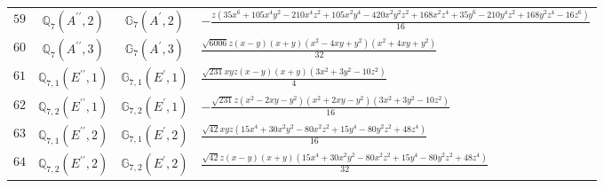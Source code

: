 \documentclass[fleqn,8pt,landscape]{jsarticle}
\begin{document}
\begin{table}[ht!]
\begin{center}
\begin{tabular}{cccl}
$ 59 $ & $ \mathbb{Q}_{7}(A^{\prime\prime},2) $ & $ \mathbb{G}_{7}(A^{\prime},2) $ & $ - \frac{z \left(35 x^{6} + 105 x^{4} y^{2} - 210 x^{4} z^{2} + 105 x^{2} y^{4} - 420 x^{2} y^{2} z^{2} + 168 x^{2} z^{4} + 35 y^{6} - 210 y^{4} z^{2} + 168 y^{2} z^{4} - 16 z^{6}\right)}{16} $ \\
$ 60 $ & $ \mathbb{Q}_{7}(A^{\prime\prime},3) $ & $ \mathbb{G}_{7}(A^{\prime},3) $ & $ \frac{\sqrt{6006} z \left(x - y\right) \left(x + y\right) \left(x^{2} - 4 x y + y^{2}\right) \left(x^{2} + 4 x y + y^{2}\right)}{32} $ \\
$ 61 $ & $ \mathbb{Q}_{7,1}(E^{\prime\prime},1) $ & $ \mathbb{G}_{7,1}(E^{\prime},1) $ & $ \frac{\sqrt{231} x y z \left(x - y\right) \left(x + y\right) \left(3 x^{2} + 3 y^{2} - 10 z^{2}\right)}{4} $ \\
$ 62 $ & $ \mathbb{Q}_{7,2}(E^{\prime\prime},1) $ & $ \mathbb{G}_{7,2}(E^{\prime},1) $ & $ - \frac{\sqrt{231} z \left(x^{2} - 2 x y - y^{2}\right) \left(x^{2} + 2 x y - y^{2}\right) \left(3 x^{2} + 3 y^{2} - 10 z^{2}\right)}{16} $ \\
$ 63 $ & $ \mathbb{Q}_{7,1}(E^{\prime\prime},2) $ & $ \mathbb{G}_{7,1}(E^{\prime},2) $ & $ \frac{\sqrt{42} x y z \left(15 x^{4} + 30 x^{2} y^{2} - 80 x^{2} z^{2} + 15 y^{4} - 80 y^{2} z^{2} + 48 z^{4}\right)}{16} $ \\
$ 64 $ & $ \mathbb{Q}_{7,2}(E^{\prime\prime},2) $ & $ \mathbb{G}_{7,2}(E^{\prime},2) $ & $ \frac{\sqrt{42} z \left(x - y\right) \left(x + y\right) \left(15 x^{4} + 30 x^{2} y^{2} - 80 x^{2} z^{2} + 15 y^{4} - 80 y^{2} z^{2} + 48 z^{4}\right)}{32} $ \\
 \hline \hline
\end{tabular}
\end{center}
\end{table}
\end{document}
